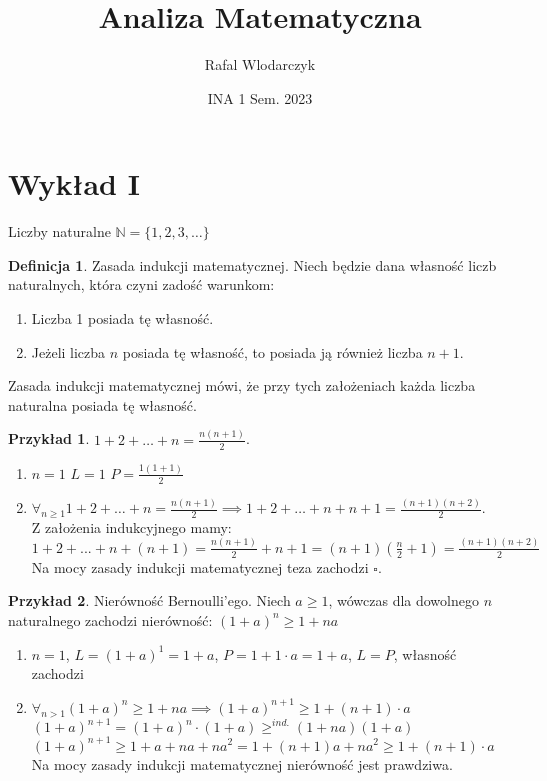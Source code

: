 \documentclass{article}
\author{Rafal Wlodarczyk}
\title{Analiza Matematyczna}
\date{INA 1 Sem. 2023}
\theoremstyle{definition}
\newtheorem{de}{Definicja}[subsection]
\theoremstyle{definition}
\theoremstyle{definition}
\newtheorem{pk}{Przykład}[subsection]
\theoremstyle{definition}
\begin{document}
\maketitle

\section{Wykład I}

Liczby naturalne $\mathbb{N}=\{1,2,3,\dots\}$

\begin{de}
    Zasada indukcji matematycznej. Niech będzie dana własność liczb naturalnych, która czyni zadość warunkom:
    \begin{enumerate}
        \item Liczba 1 posiada tę własność.
        \item Jeżeli liczba $n$ posiada tę własność, to posiada ją również liczba $n+1$.
    \end{enumerate}
    Zasada indukcji matematycznej mówi, że przy tych założeniach każda liczba naturalna posiada tę własność.
\end{de}

\begin{pk}
    $1+2+\dots+n=\frac{n(n+1)}{2}$.
    \begin{enumerate}
        \item $n=1$ $L=1$ $P=\frac{1(1+1)}{2}$
        \item $\forall_{n\geq 1} 1+2+\dots+n=\frac{n(n+1)}{2} \implies 1+2+\dots+n+n+1=\frac{(n+1)(n+2)}{2}$.\\
        Z założenia indukcyjnego mamy:\\
        $1+2+...+n+(n+1)=\frac{n(n+1)}{2}+n+1=(n+1)(\frac{n}{2}+1)=\frac{(n+1)(n+2)}{2}$\\
        Na mocy zasady indukcji matematycznej teza zachodzi $\square$.
    \end{enumerate}
\end{pk}

\begin{pk}
    Nierówność Bernoulli'ego. Niech $a\geq 1$, wówczas dla dowolnego $n$ naturalnego zachodzi nierówność:
    $(1+a)^n \geq 1 + na$
    \begin{enumerate}
        \item $n=1$, $L=(1+a)^1 = 1+a$, $P=1+1\cdot a = 1+ a$, $L=P$, własność zachodzi
        \item $\forall_{n>1} (1+a)^n \geq 1 + na \implies (1+a)^{n+1} \geq 1 + (n+1)\cdot a$\\
        $(1+a)^{n+1}=(1+a)^n\cdot(1+a)\geq^{ind.} (1+na)(1+a)$\\
        $(1+a)^{n+1} \geq 1 + a + na + na^2 = 1 + (n+1)a + na^2 \geq 1 + (n+1)\cdot a$\\
        Na mocy zasady indukcji matematycznej nierówność jest prawdziwa.
    \end{enumerate}
\end{pk}
\end{document}
